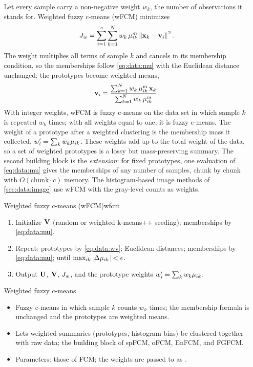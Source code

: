 Let every sample carry a non-negative weight $w_k$, the number of observations it stands for. Weighted fuzzy c-means (wFCM) minimizes
\begin{equation}
  J_w=\sum_{i=1}^{c}\sum_{k=1}^{N}w_k\,\mu_{ik}^m\left\lVert \mathbf{x}_k-\mathbf{v}_i \right\rVert^2 .
  \label{eq:data:wJ}
\end{equation}
The weight multiplies all terms of sample $k$ and cancels in its membership condition, so the memberships follow \eqref{eq:data:mu} with the Euclidean distance unchanged; the prototypes become weighted means,
\begin{equation}
  \mathbf{v}_i=\frac{\sum_{k=1}^{N}w_k\,\mu_{ik}^m\,\mathbf{x}_k}{\sum_{k=1}^{N}w_k\,\mu_{ik}^m} .
  \label{eq:data:wv}
\end{equation}
With integer weights, wFCM is fuzzy c-means on the data set in which sample $k$ is repeated $w_k$ times; with all weights equal to one, it is fuzzy c-means. The weight of a prototype after a weighted clustering is the membership mass it collected, $w'_i=\sum_kw_k\mu_{ik}$. These weights add up to the total weight of the data, so a set of weighted prototypes is a lossy but mass-preserving summary. The second building block is the \emph{extension}: for fixed prototypes, one evaluation of \eqref{eq:data:mu} gives the memberships of any number of samples, chunk by chunk with $O(\text{chunk}\cdot c)$ memory. The histogram-based image methods of \cref{sec:data:image} use wFCM with the gray-level counts as weights.

\begin{algobox}{Weighted fuzzy c-means (wFCM)}{wfcm}
\begin{enumerate}[leftmargin=*]
  \item Initialize $\mathbf{V}$ (random or weighted k-means++ seeding); memberships by \eqref{eq:data:mu}.
  \item Repeat: prototypes by \eqref{eq:data:wv}; Euclidean distances; memberships by \eqref{eq:data:mu}; until $\max_{ik}\left\lvert \Delta\mu_{ik} \right\rvert<\epsilon$.
  \item Output $\mathbf{U}$, $\mathbf{V}$, $J_w$, and the prototype weights $w'_i=\sum_kw_k\mu_{ik}$.
\end{enumerate}
\end{algobox}
\begin{summarybox}{Weighted fuzzy c-means}
\begin{itemize}
  \item Fuzzy c-means in which sample $k$ counts $w_k$ times; the membership formula is unchanged and the prototypes are weighted means.
  \item Lets weighted summaries (prototypes, histogram bins) be clustered together with raw data; the building block of spFCM, oFCM, EnFCM, and FGFCM.
  \item Parameters: those of FCM; the weights are passed to  as .
\end{itemize}
\end{summarybox}


